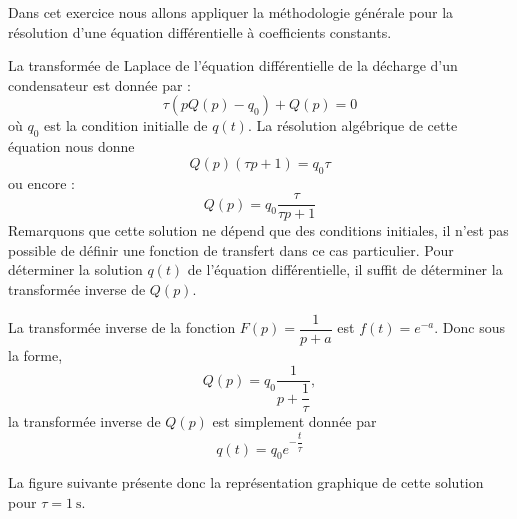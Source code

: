 
Dans cet exercice nous allons appliquer la méthodologie générale pour la
résolution d'une équation différentielle à coefficients constants.


\question{}
La transformée de Laplace de l'équation différentielle de la décharge d'un
condensateur est donnée par :
\[
    \tau(pQ(p)-q_0)+Q(p)=0
\]
où $q_0$ est la condition initialle de $q(t)$.
La résolution algébrique de cette équation nous donne 
\[
    Q(p)(\tau p+1)=q_0\tau
\]
ou encore :
\[
    Q(p)=q_0\dfrac{\tau}{\tau p+1}
\]
Remarquons que cette solution ne dépend que des conditions initiales, il n'est 
pas possible de définir une fonction de transfert dans ce cas particulier.
\question{}
Pour déterminer la solution $q(t)$ de l'équation différentielle, il suffit de 
déterminer la transformée inverse de $Q(p)$.

La transformée inverse de la fonction $F(p)=\dfrac{1}{p+a}$ est $f(t)=e^{-a}$.
Donc sous la forme,
\[
    Q(p)=q_0\dfrac{1}{p+\dfrac{1}{\tau}},
\]
la transformée inverse de $Q(p)$ est simplement donnée par 
\[
    q(t)=q_0e^{-\dfrac{t}{\tau}}
\]

\begin{center}
    
\end{center}

La figure suivante présente donc la représentation graphique de cette solution 
pour $\tau=\SI{1}{\second}$.

\begin{figure}[!h]
    \centering
    
\end{figure}

